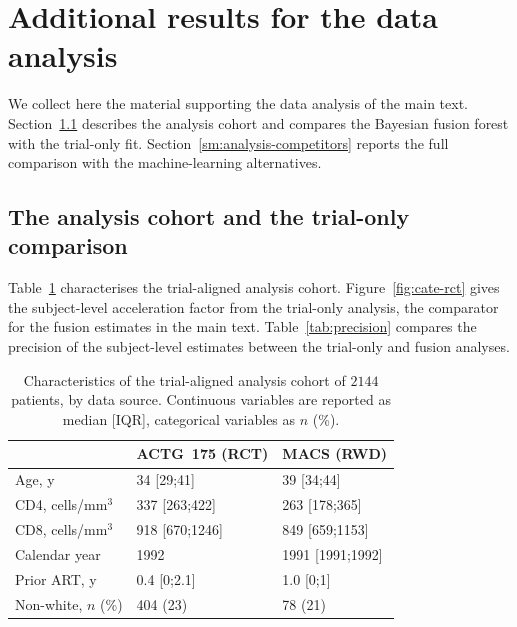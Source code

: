 
\newpage
\section{Additional results for the data analysis}\label{sm:analysis-additional}

We collect here the material supporting the data analysis of the main text.
Section~\ref{sm:analysis-cohort} describes the analysis cohort and compares the Bayesian fusion forest with the trial-only fit.
Section~\ref{sm:analysis-competitors} reports the full comparison with the machine-learning alternatives.

\subsection{The analysis cohort and the trial-only comparison}\label{sm:analysis-cohort}

Table~\ref{tab:cohort} characterises the trial-aligned analysis cohort.
Figure~\ref{fig:cate-rct} gives the subject-level acceleration factor from the trial-only analysis, the comparator for the fusion estimates in the main text.
Table~\ref{tab:precision} compares the precision of the subject-level estimates between the trial-only and fusion analyses.

\begin{table}[h]
  \centering
  \caption{Characteristics of the trial-aligned analysis cohort of
    $2144$ patients, by data source. Continuous variables are reported
    as median [IQR], categorical variables as $n$ (\%).}
  \label{tab:cohort}
  \begin{tabular}{@{}lll@{}}
    \toprule
                                    & ACTG~175 (RCT)  & MACS (RWD)        \\
    \midrule
    Age, y                          & 34 [29;41]     & 39 [34;44]      \\
    CD4, cells/mm$^3$               & 337 [263;422]  & 263 [178;365]   \\
    CD8, cells/mm$^3$               & 918 [670;1246] & 849 [659;1153]  \\
    Calendar year                   & 1992            & 1991 [1991;1992]\\
    Prior ART, y                    & 0.4 [0;2.1]    & 1.0 [0;1]       \\
    Non-white, $n$ (\%)             & 404 (23)        & 78 (21)          \\
    \bottomrule
  \end{tabular}
\end{table}

